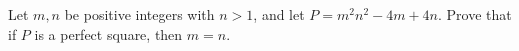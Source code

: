 Let $m,n$ be positive integers with $n>1$, and let $P=m^2n^2-4m+4n$. Prove that if $P$ is a perfect square, then $m=n$.
